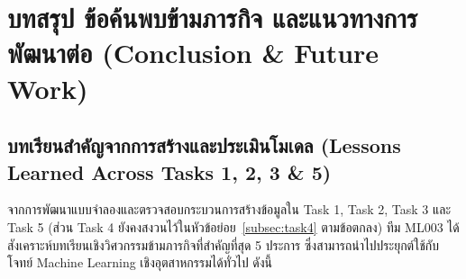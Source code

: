 \clearpage
\section{บทสรุป ข้อค้นพบข้ามภารกิจ และแนวทางการพัฒนาต่อ (Conclusion \& Future Work)}
\label{sec:conclusion}

\subsection{บทเรียนสำคัญจากการสร้างและประเมินโมเดล (Lessons Learned Across Tasks 1, 2, 3 \& 5)}
\label{subsec:lessons_learned}

จากการพัฒนาแบบจำลองและตรวจสอบกระบวนการสร้างข้อมูลใน Task 1, Task 2, Task 3 และ Task 5 (ส่วน Task 4 ยังคงสงวนไว้ในหัวข้อย่อย~\ref{subsec:task4} ตามข้อตกลง) ทีม ML003 ได้สังเคราะห์บทเรียนเชิงวิศวกรรมข้ามภารกิจที่สำคัญที่สุด 5 ประการ ซึ่งสามารถนำไปประยุกต์ใช้กับโจทย์ Machine Learning เชิงอุตสาหกรรมได้ทั่วไป ดังนี้

